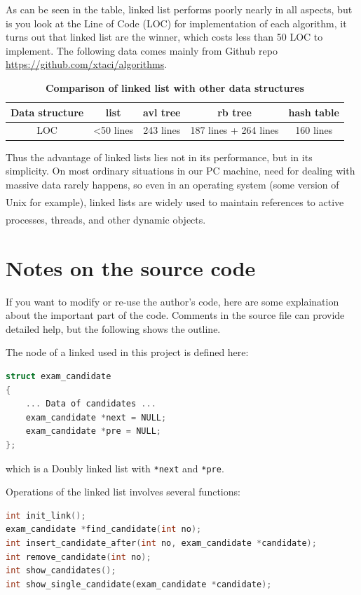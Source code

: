 \documentclass[cn,black,12pt,normal]{elegantnote}
\newcommand{\uct}[1]{\textsuperscript{\textsuperscript{\cite{#1}}}}
\begin{document}
As can be seen in the table, linked list performs poorly nearly in all aspects, but is you look at the Line of Code (LOC) for implementation of each algorithm, it turns out that linked list are the winner, which costs less than 50 LOC to implement. The following data comes mainly from Github repo \url{https://github.com/xtaci/algorithms}.

\begin{table}[H]
    \caption{\textbf{Comparison of linked list with other data structures}}
    \centering
    \begin{tabular}{c|cccc}
        \toprule
        Data structure & list      & avl tree   & rb tree               & hash table \\
        \midrule
        LOC            & <50 lines & 243 lines & 187 lines + 264 lines & 160 lines  \\
        \bottomrule
    \end{tabular}
\end{table}

Thus the advantage of linked lists lies not in its performance, but in its simplicity. On most ordinary situations in our PC machine, need for dealing with massive data rarely happens, so even in an operating system (some version of Unix for example\uct{bach1986design}), linked lists are widely used to maintain references to active processes, threads, and other dynamic objects.\uct{wiki:Linked_list}


\section{Notes on the source code}

If you want to modify or re-use the author's code, here are some explaination about the important part of the code. Comments in the source file can provide detailed help, but the following shows the outline.

The node of a linked used in this project is defined here:
\begin{lstlisting}[language = C++]
struct exam_candidate
{
    ... Data of candidates ...
    exam_candidate *next = NULL;
    exam_candidate *pre = NULL;
};
\end{lstlisting}
which is a Doubly linked list with \lstinline{*next} and \lstinline{*pre}.

Operations of the linked list involves several functions:
\begin{lstlisting}[language = C++]
int init_link();
exam_candidate *find_candidate(int no);
int insert_candidate_after(int no, exam_candidate *candidate);
int remove_candidate(int no);
int show_candidates();
int show_single_candidate(exam_candidate *candidate);
\end{lstlisting}
\end{document}

